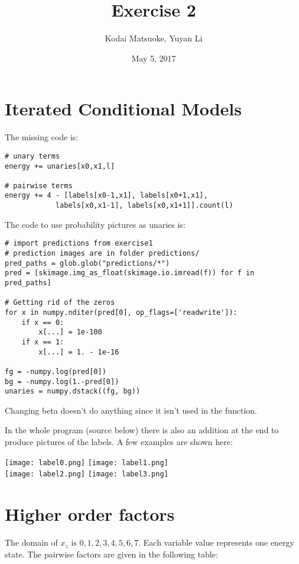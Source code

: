 \documentclass[12pt,a4paper]{scrartcl}
\author{Kodai Matsuoke, Yuyan Li}
\title{Exercise 2}
\date{May 5, 2017}
\begin{document}
\maketitle

\section{Iterated Conditional Models}

The missing code is:

\begin{verbatim}
# unary terms
energy += unaries[x0,x1,l]

# pairwise terms
energy += 4 - [labels[x0-1,x1], labels[x0+1,x1],
            labels[x0,x1-1], labels[x0,x1+1]].count(l)
\end{verbatim}

The code to use probability pictures as unaries is:

\begin{verbatim}
# import predictions from exercise1
# prediction images are in folder predictions/
pred_paths = glob.glob("predictions/*")
pred = [skimage.img_as_float(skimage.io.imread(f)) for f in pred_paths]

# Getting rid of the zeros
for x in numpy.nditer(pred[0], op_flags=['readwrite']):
    if x == 0:
        x[...] = 1e-100
    if x == 1:
        x[...] = 1. - 1e-16

fg = -numpy.log(pred[0])
bg = -numpy.log(1.-pred[0])
unaries = numpy.dstack((fg, bg))
\end{verbatim}

Changing beta doesn't do anything since it isn't used in the function.

In the whole program (source below) there is also an addition at the end to produce pictures of the labels. A few examples are shown here:

\texttt{[image: label0.png]}
\texttt{[image: label1.png]}
\\
\texttt{[image: label2.png]}
\texttt{[image: label3.png]}
\\


\section{Higher order factors}
The domain of $x_z$ is ${0,1,2,3,4,5,6,7}$. Each variable value represents one energy state. The pairwise factors are given in the following table:
\end{document}
